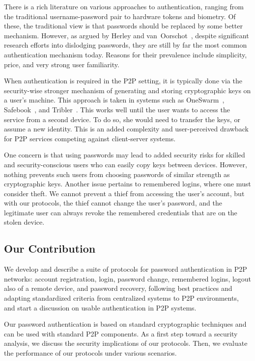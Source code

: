 There is a rich literature on various approaches to authentication, ranging
from the traditional username-password pair to hardware tokens and
biometry. Of these, the traditional view is that passwords should be replaced
by some better mechanism. However, as argued by Herley and
van~Oorschot~\cite{HerleyO12}, despite significant research efforts into
dislodging passwords, they are still by far the most common authentication
mechanism today. Reasons for their prevalence include simplicity, price, and
very strong user familiarity.

When authentication is required in the P2P setting, it is typically done
via the security-wise stronger mechanism of generating and storing
cryptographic keys on a user's machine. This approach is taken in systems such
as OneSwarm~\cite{IsdalPKA10}, Safebook~\cite{Cutillo09a}, and
Tribler~\cite{AbbasPES09}.  This works well until the user wants to access the service from a second
device. To do so, she would need to transfer the keys, or assume a new
identity. This is an added complexity and user-perceived drawback for P2P
services competing against client-server systems.

One concern is that using passwords may lead to added security risks
for skilled and security-conscious users who can easily copy keys
between devices.  However, nothing prevents such users from choosing
passwords of similar strength as cryptographic keys. Another issue
pertains to remembered logins, where one must consider theft. We
cannot prevent a thief from accessing the user's account, but with our
protocols, the thief cannot change the user's password, and the
legitimate user can always revoke the remembered credentials that are
on the stolen device.

\subsection{Our Contribution}
We develop and describe a suite of protocols for password
authentication in P2P networks: account registration, login,
password change, remembered logins, logout also of a remote device, and password
recovery, following best practices and adapting standardized criteria
from centralized systems to P2P environments, and start a
discussion on usable authentication in P2P systems.

Our password authentication is based on standard
cryptographic techniques and can be used with standard P2P components. As a
first step toward a security analysis, we discuss the security implications of
our protocols. Then, we evaluate the performance of our protocols under various
scenarios.

